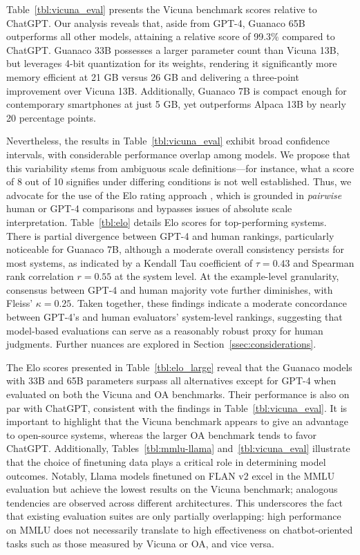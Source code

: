 Table~\ref{tbl:vicuna_eval} presents the Vicuna benchmark \cite{vicuna2023} scores relative to ChatGPT. Our analysis reveals that, aside from GPT-4, {Guanaco} 65B outperforms all other models, attaining a relative score of 99.3\% compared to ChatGPT. {Guanaco} 33B possesses a larger parameter count than Vicuna 13B, but leverages 4-bit quantization for its weights, rendering it significantly more memory efficient at 21 GB versus 26 GB and delivering a three-point improvement over Vicuna 13B. Additionally, {Guanaco} 7B is compact enough for contemporary smartphones at just 5 GB, yet outperforms Alpaca 13B by nearly 20 percentage points.

Nevertheless, the results in Table~\ref{tbl:vicuna_eval} exhibit broad confidence intervals, with considerable performance overlap among models. We propose that this variability stems from ambiguous scale definitions—for instance, what a score of 8 out of 10 signifies under differing conditions is not well established. Thus, we advocate for the use of the Elo rating approach \citep{elo1967proposed}, which is grounded in \textit{pairwise} human or GPT-4 comparisons and bypasses issues of absolute scale interpretation. Table~\ref{tbl:elo} details Elo scores for top-performing systems. There is partial divergence between GPT-4 and human rankings, particularly noticeable for Guanaco 7B, although a moderate overall consistency persists for most systems, as indicated by a Kendall Tau coefficient of $\tau=0.43$ and Spearman rank correlation $r=0.55$ at the system level. At the example-level granularity, consensus between GPT-4 and human majority vote further diminishes, with Fleiss’ $\kappa=0.25$. Taken together, these findings indicate a moderate concordance between GPT-4’s and human evaluators’ system-level rankings, suggesting that model-based evaluations can serve as a reasonably robust proxy for human judgments. Further nuances are explored in Section~\ref{ssec:considerations}.

The Elo scores presented in Table~\ref{tbl:elo_large} reveal that the {Guanaco} models with 33B and 65B parameters surpass all alternatives except for GPT-4 when evaluated on both the Vicuna and OA benchmarks. Their performance is also on par with ChatGPT, consistent with the findings in Table~\ref{tbl:vicuna_eval}. It is important to highlight that the Vicuna benchmark appears to give an advantage to open-source systems, whereas the larger OA benchmark tends to favor ChatGPT. Additionally, Tables~\ref{tbl:mmlu-llama} and~\ref{tbl:vicuna_eval} illustrate that the choice of finetuning data plays a critical role in determining model outcomes. Notably, Llama models finetuned on FLAN v2 excel in the MMLU evaluation but achieve the lowest results on the Vicuna benchmark; analogous tendencies are observed across different architectures. This underscores the fact that existing evaluation suites are only partially overlapping: high performance on MMLU does not necessarily translate to high effectiveness on chatbot-oriented tasks such as those measured by Vicuna or OA, and vice versa.

